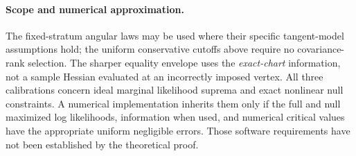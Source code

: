 \paragraph{Scope and numerical approximation.}
The fixed-stratum angular laws may be used where their
specific tangent-model assumptions hold; the uniform
conservative cutoffs above require no covariance-rank
selection. The sharper equality envelope uses the
\emph{exact-chart} information, not a sample Hessian evaluated
at an incorrectly imposed vertex. All three calibrations
concern ideal marginal likelihood suprema and exact nonlinear
null constraints. A numerical implementation inherits them
only if the full and null maximized log likelihoods, information
when used, and numerical critical values have the appropriate
uniform negligible errors. Those software requirements have
not been established by the theoretical proof.
